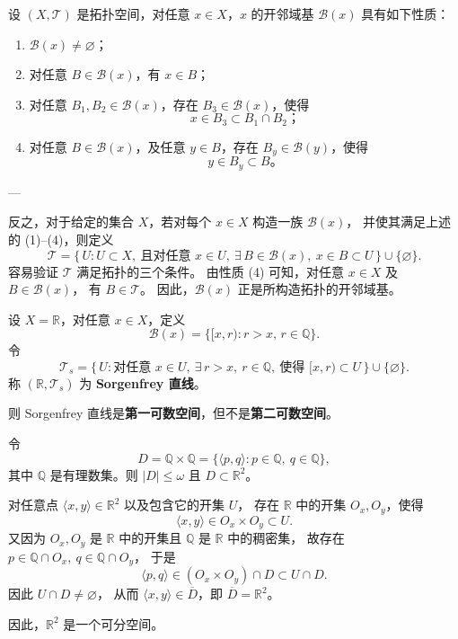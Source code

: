 \begin{proposition}[开邻域基的构造]
设 $(X,\mathcal{T})$ 是拓扑空间，对任意 $x\in X$，$x$ 的开邻域基 $\mathcal{B}(x)$ 具有如下性质：
\begin{enumerate}
  \item[(1)] $\mathcal{B}(x)\neq\varnothing$；
  \item[(2)] 对任意 $B\in\mathcal{B}(x)$，有 $x\in B$；
  \item[(3)] 对任意 $B_1,B_2\in\mathcal{B}(x)$，存在 $B_3\in\mathcal{B}(x)$，使得
  \[
  x\in B_3\subset B_1\cap B_2；
  \]
  \item[(4)] 对任意 $B\in\mathcal{B}(x)$，及任意 $y\in B$，存在 $B_y\in\mathcal{B}(y)$，使得
  \[
  y\in B_y\subset B。
  \]
\end{enumerate}

---

反之，对于给定的集合 $X$，若对每个 $x\in X$ 构造一族 $\mathcal{B}(x)$，
并使其满足上述的 (1)--(4)，则定义
\[
\mathcal{T}=\{\,U: U\subset X,\ \text{且对任意 }x\in U,\ \exists\,B\in\mathcal{B}(x),\ 
x\in B\subset U\,\}\cup\{\varnothing\}.
\]
容易验证 $\mathcal{T}$ 满足拓扑的三个条件。
由性质 (4) 可知，对任意 $x\in X$ 及 $B\in\mathcal{B}(x)$，
有 $B\in\mathcal{T}$。
因此，$\mathcal{B}(x)$ 正是所构造拓扑的开邻域基。
\end{proposition}
\begin{example}[Sorgenfrey 直线]
设 $X = \mathbb{R}$，对任意 $x \in X$，定义
\[
\mathcal{B}(x) = \{[x, r) : r > x,\, r \in \mathbb{Q}\}.
\]
令
\[
\mathcal{T}_s = 
\{\,U : \text{对任意 } x \in U,\ \exists\, r > x,\ r \in \mathbb{Q},
\ \text{使得 } [x, r) \subset U\,\} \cup \{\varnothing\}.
\]
称 $(\mathbb{R}, \mathcal{T}_s)$ 为 \textbf{Sorgenfrey 直线}。

则 Sorgenfrey 直线是\textbf{第一可数空间}，但不是\textbf{第二可数空间}。
\end{example}
\begin{example}
令
\[
D = \mathbb{Q} \times \mathbb{Q}
= \{ \langle p, q \rangle : p \in \mathbb{Q},\ q \in \mathbb{Q} \},
\]
其中 $\mathbb{Q}$ 是有理数集。则 $|D| \le \omega$ 且 $D \subset \mathbb{R}^2$。

对任意点 $\langle x, y \rangle \in \mathbb{R}^2$ 以及包含它的开集 $U$，
存在 $\mathbb{R}$ 中的开集 $O_x, O_y$，使得
\[
\langle x, y \rangle \in O_x \times O_y \subset U.
\]
又因为 $O_x, O_y$ 是 $\mathbb{R}$ 中的开集且 $\mathbb{Q}$ 是 $\mathbb{R}$ 中的稠密集，
故存在 $p \in \mathbb{Q} \cap O_x,\ q \in \mathbb{Q} \cap O_y$，
于是
\[
\langle p, q \rangle \in (O_x \times O_y) \cap D \subset U \cap D.
\]
因此 $U \cap D \ne \varnothing$，
从而 $\langle x, y \rangle \in \overline{D}$，即 $\overline{D} = \mathbb{R}^2$。

因此，$\mathbb{R}^2$ 是一个可分空间。 
\end{example}

